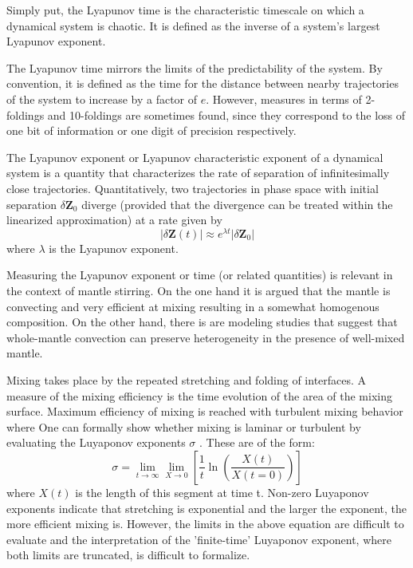 

Simply put, the Lyapunov time is the characteristic timescale on which a dynamical system is chaotic.
 It is defined as the inverse of a system's largest Lyapunov exponent.

The Lyapunov time mirrors the limits of the predictability of the system. By convention, it is defined 
as the time for the distance between nearby trajectories of the system to increase by a factor of $e$. 
However, measures in terms of 2-foldings and 10-foldings are sometimes found, since they correspond to 
the loss of one bit of information or one digit of precision respectively.

The Lyapunov exponent or Lyapunov characteristic exponent of a dynamical system is a quantity 
that characterizes the rate of separation of infinitesimally close trajectories. 
Quantitatively, two trajectories in phase space with initial separation $\delta \mathbf{Z}_0$ 
diverge (provided that the divergence can be treated within the linearized approximation) at a rate given by
\[
|\delta \mathbf{Z} (t)|\approx e^{\lambda t}|\delta \mathbf {Z} _{0}| 
\]
where $\lambda$ is the Lyapunov exponent. 

Measuring the Lyapunov exponent or time (or related quantities) is relevant in the context of mantle stirring. 
On the one hand it is argued that the mantle is convecting and very efficient at mixing resulting in a 
somewhat homogenous composition. On the other hand, there is are modeling studies that suggest that
whole-mantle convection can preserve heterogeneity in the presence of well-mixed mantle. 

Mixing takes place by the repeated stretching
and folding of interfaces. A measure of the
mixing efficiency is the time evolution of the area of
the mixing surface. Maximum efficiency of mixing
is reached with turbulent mixing behavior where
One can formally show whether mixing is laminar or turbulent by evaluating the Luyaponov exponents $\sigma$ .
These are of the form:
\[
\sigma = \lim_{t\rightarrow \infty} \lim_{X\rightarrow 0} \left[  \frac{1}{t} \ln \left( \frac{X(t)}{X(t=0)} \right)   \right]
\]
where $X(t)$ is the length of this segment at time t.
Non-zero Luyaponov exponents indicate that
stretching is exponential and the larger the exponent,
the more efficient mixing is.
However, the limits in the above equation are difficult to evaluate and the interpretation 
of the 'finite-time' Luyaponov exponent, where both limits are truncated, is difficult to formalize.


